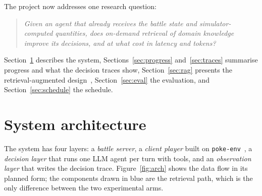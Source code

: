 \documentclass[11pt,a4paper]{article}
\newcommand{\code}[1]{\texttt{#1}}
\begin{document}
\noindent
The project now addresses one research question:

\begin{quote}
\emph{Given an agent that already receives the battle state and simulator-computed quantities, does
on-demand retrieval of domain knowledge improve its decisions, and at what cost in latency and tokens?}
\end{quote}

\noindent
Section~\ref{sec:arch} describes the system, Sections~\ref{sec:progress} and~\ref{sec:traces} summarise
progress and what the decision traces show, Section~\ref{sec:rag} presents the retrieval-augmented design~\cite{rag},
Section~\ref{sec:eval} the evaluation, and Section~\ref{sec:schedule} the schedule.

\section{System architecture}
\label{sec:arch}

The system has four layers: a \emph{battle server}, a \emph{client player} built on \code{poke-env}~\cite{pokeenv}, a
\emph{decision layer} that runs one LLM agent per turn with tools, and an \emph{observation layer} that writes
the decision trace. Figure~\ref{fig:arch} shows the data flow in its planned form; the components drawn in
blue are the retrieval path, which is the only difference between the two experimental arms.
\end{document}
